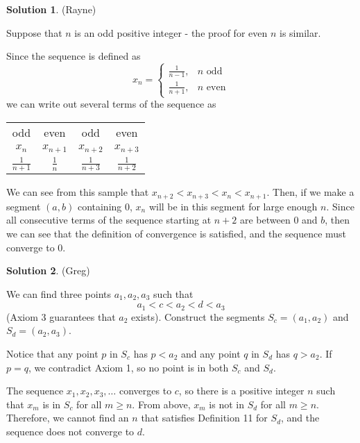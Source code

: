 \documentclass{article}
\theoremstyle{definition}
\newtheorem{solution}{Solution}
\begin{document}
\begin{solution} %
(Rayne)

Suppose that $n$ is an odd positive integer - the proof for even $n$ is similar.

Since the sequence is defined as
\begin{equation*}
	x_n =
	\begin{cases}
		\frac{1}{n-1}, &n \text{ odd} \\
		\frac{1}{n+1}, &n \text{ even} 
	\end{cases}
\end{equation*}
we can write out several terms of the sequence as

{
\begin{center}
\begin{tabular}{c|c|c|c}
	odd & even & odd & even \\
	$x_n$ & $x_{n+1}$ & $x_{n+2}$ & $x_{n+3}$ \\
	\hline
	$\frac{1}{n+1}$ & $\frac{1}{n}$ & $\frac{1}{n+3}$ & $\frac{1}{n+2}$
\end{tabular}
\end{center}
}

We can see from this sample that $x_{n+2} < x_{n+3} < x_{n} < x_{n+1}$.
Then, if we make a segment $(a,b)$ containing $0$, $x_n$ will be in this segment for large enough $n$.
Since all consecutive terms of the sequence starting at $n+2$ are between $0$ and $b$, then we can see that the definition of convergence is satisfied, and the sequence must converge to $0$.
\end{solution}

\begin{solution} %
(Greg)

We can find three points $a_1, a_2, a_3$ such that
\begin{equation*}
	a_1 < c < a_2 < d < a_3
\end{equation*}
(Axiom 3 guarantees that $a_2$ exists).
Construct the segments $S_c = (a_1, a_2)$ and $S_d = (a_2, a_3)$.

Notice that any point $p$ in $S_c$ has $p < a_2$ and any point $q$ in $S_d$ has $q > a_2$.
If $p = q$, we contradict Axiom 1, so no point is in both $S_c$ and $S_d$.

The sequence $x_1, x_2, x_3, \dots$ converges to $c$, so there is a positive integer $n$ such that $x_m$ is in $S_c$ for all $m \geq n$.
From above, $x_m$ is not in $S_d$ for all $m \geq n$.
Therefore, we cannot find an $n$ that satisfies Definition 11 for $S_d$, and the sequence does not converge to $d$. 
\end{solution}
\end{document}

